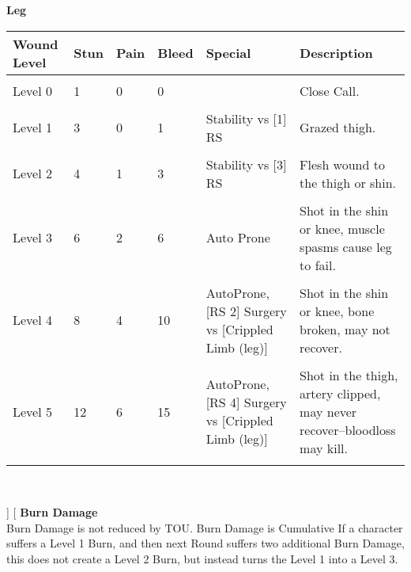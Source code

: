 \documentclass[a4paper, twocolumn, openany]{book}
\begin{document}
{{{\bfseries Leg\\}

{\centering
\begin{tabular}{llllp{3cm}p{7cm}}
Wound Level 	& Stun 	& Pain 	& Bleed 	& Special 											& Description \\ \hline \\
Level 0 		& 1 	& 0 	& 0 		& 													& Close Call. \\ \\
Level 1 		& 3 	& 0 	& 1 		& Stability vs [1] RS								& Grazed thigh. \\ \\
Level 2 		& 4 	& 1 	& 3 		& Stability vs [3] RS								& Flesh wound to the thigh or shin. \\ \\
Level 3 		& 6 	& 2 	& 6 		& Auto Prone										& Shot in the shin or knee, muscle spasms cause leg to fail. \\ \\
Level 4 		& 8 	& 4 	& 10 		& AutoProne, [RS 2] Surgery vs [Crippled Limb (leg)]& Shot in the shin or knee, bone broken, may not recover. \\ \\
Level 5 		& 12 	& 6 	& 15 		& AutoProne, [RS 4] Surgery vs [Crippled Limb (leg)]& Shot in the thigh, artery clipped, may never recover--bloodloss may kill. \\ 
\\ \hline
\end{tabular}\\[\baselineskip] }

}]
\twocolumn[{
{\bfseries Burn Damage\\}
Burn Damage is not reduced by TOU. Burn Damage is Cumulative If a character suffers a Level
1 Burn, and then next Round suffers two additional Burn Damage, this does not create a Level 2
Burn, but instead turns the Level 1 into a Level 3.\\

}}
\end{document}
